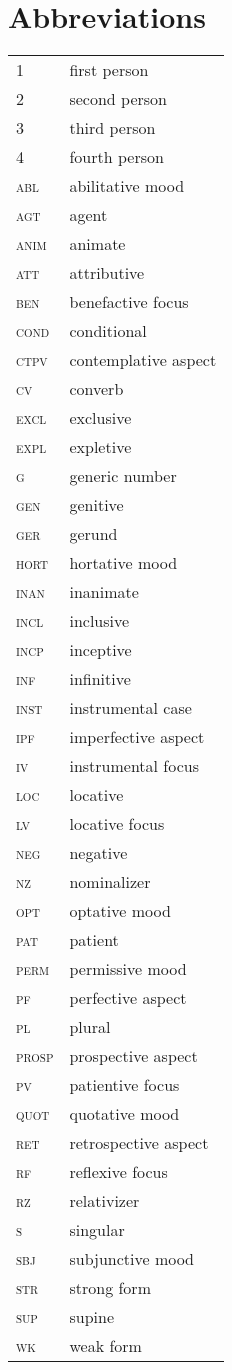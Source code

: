 \chapter*{Abbreviations}

	\begin{longtabu} to 0.8
		1		& first person\\
		2		& second person\\
		3		& third person\\
		4		& fourth person\\
		abl		& abilitative mood\\
		agt		& agent\\
		anim	& animate\\
		att		& attributive\\
		ben		& benefactive focus\\
		cond	& conditional\\
		ctpv	& contemplative aspect\\
		cv		& converb\\
		excl	& exclusive\\
		expl	& expletive\\
		g		& generic number\\
		gen 	& genitive\\
		ger		& gerund\\
		hort	& hortative mood\\
		inan	& inanimate\\
		incl	& inclusive\\
		incp	& inceptive\\
		inf		& infinitive\\
		inst	& instrumental case\\
		ipf		& imperfective aspect\\
		iv		& instrumental focus\\
		loc		& locative\\
		lv		& locative focus\\
		neg		& negative\\
		nz		& nominalizer\\
		opt		& optative mood\\
		pat		& patient\\
		perm	& permissive mood\\
		pf		& perfective aspect\\
		pl		& plural\\
		prosp	& prospective aspect\\
		pv		& patientive focus\\
		quot	& quotative mood\\
		ret		& retrospective aspect\\
		rf		& reflexive focus\\
		rz		& relativizer\\
		s		& singular\\
		sbj		& subjunctive mood\\
		str		& strong form\\
		sup		& supine\\
		wk		& weak form\\
	\end{longtabu}
